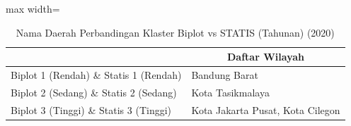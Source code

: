 \begin{table}[H]
\centering
\caption{Nama Daerah Perbandingan Klaster Biplot vs STATIS (Tahunan) (2020)} \label{tab:sample2biplot_statis_comp_name_2020}
\begin{adjustbox}{max width=\textwidth}
\begin{tabular}{|>{\centering\arraybackslash}p{4cm}|p{10cm}|}
\hline
\multicolumn{1}{|c|}{\textbf{Kategori}} & \multicolumn{1}{c|}{\textbf{Daftar Wilayah}} \\
\hline
Biplot 1 (Rendah) \& Statis 1 (Rendah) & Bandung Barat \\
\hline
Biplot 2 (Sedang) \& Statis 2 (Sedang) & Kota Tasikmalaya \\
\hline
Biplot 3 (Tinggi) \& Statis 3 (Tinggi) & Kota Jakarta Pusat, Kota Cilegon \\
\hline
\end{tabular}
\end{adjustbox}
\end{table}